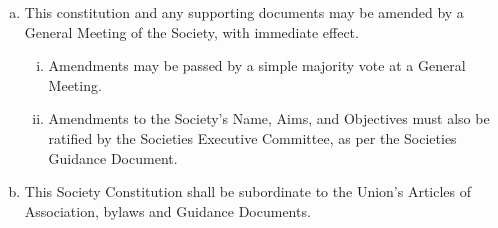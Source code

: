 \begin{enumerate}[(a).]
    \item This constitution and any supporting documents may be amended by a General Meeting of the Society, with immediate effect.
    \begin{enumerate}[i.]
        \item Amendments may be passed by a simple majority vote at a General Meeting.
        \item Amendments to the Society’s Name, Aims, and Objectives must also be ratified by the Societies Executive Committee, as per the Societies Guidance Document.
    \end{enumerate}

    \item This Society Constitution shall be subordinate to the Union’s Articles of Association, bylaws and Guidance Documents.
\end{enumerate}